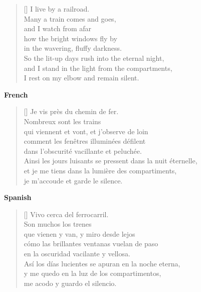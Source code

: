 \documentclass[a4paper,12pt,twoside,final]{book}
\begin{document}
\newpage



\settowidth{\versewidth}{and I stand in the light from the compartments,}

\begin{verse}[\versewidth]
  I live by a railroad. \\
  Many a train comes and goes, \\
  and I watch from afar \\
  how the bright windows fly by \\
  in the wavering, fluffy darkness. \\
  So the lit-up days rush into the eternal night, \\
  and I stand in the light from the compartments, \\
  I rest on my elbow and remain silent. \\
\end{verse}

\bigskip

\noindent \textbf{French}


\settowidth{\versewidth}{Ainsi les jours luisants se pressent dans la nuit éternelle,}

\begin{verse}[\versewidth]
  Je vis près du chemin de fer. \\
  Nombreux sont les trains \\
  qui viennent et vont, et j'observe de loin \\
  comment les fenêtres illuminées défilent \\
  dans l'obscurité vacillante et peluchée. \\
  Ainsi les jours luisants se pressent dans la nuit éternelle, \\
  et je me tiens dans la lumière des compartiments, \\
  je m'accoude et garde le silence. \\
\end{verse}

\bigskip

\noindent \textbf{Spanish}


\settowidth{\versewidth}{Así los días lucientes se apuran en la noche eterna,}

\begin{verse}[\versewidth]
  Vivo cerca del ferrocarril. \\
  Son muchos los trenes \\
  que vienen y van, y miro desde lejos \\
  cómo las brillantes ventanas vuelan de paso \\
  en la oscuridad vacilante y vellosa. \\
  Así los días lucientes se apuran en la noche eterna, \\
  y me quedo en la luz de los compartimentos, \\
  me acodo y guardo el silencio. \\
\end{verse}
\end{document}
